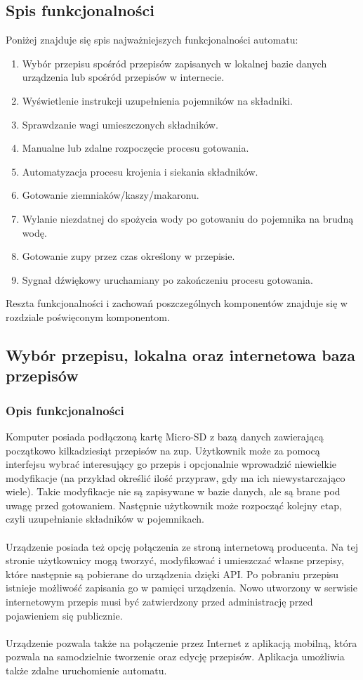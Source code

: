 \documentclass[12pt,a4paper,notitlepage]{article}
\begin{document}
\subsection{Spis funkcjonalności}
Poniżej znajduje się spis najważniejszych funkcjonalności automatu:
\begin{enumerate}
  \item Wybór przepisu spośród przepisów zapisanych w lokalnej bazie danych urządzenia lub spośród przepisów w internecie.
  \item Wyświetlenie instrukcji uzupełnienia pojemników na składniki.
  \item Sprawdzanie wagi umieszczonych składników.
  \item Manualne lub zdalne rozpoczęcie procesu gotowania.
  \item Automatyzacja procesu krojenia i siekania składników.
  \item Gotowanie ziemniaków/kaszy/makaronu.
  \item Wylanie niezdatnej do spożycia wody po gotowaniu do pojemnika na brudną wodę.
  \item Gotowanie zupy przez czas określony w przepisie.
  \item Sygnał dźwiękowy uruchamiany po zakończeniu procesu gotowania.
\end{enumerate}
Reszta funkcjonalności i zachowań poszczególnych komponentów znajduje się w rozdziale poświęconym komponentom.

\subsection{Wybór przepisu, lokalna oraz internetowa baza przepisów}
\subsubsection{Opis funkcjonalności}
Komputer posiada podłączoną kartę Micro-SD z bazą danych zawierającą początkowo kilkadziesiąt przepisów na zup. Użytkownik może za pomocą interfejsu wybrać interesujący go przepis i opcjonalnie wprowadzić niewielkie modyfikacje (na przykład określić ilość przypraw, gdy ma ich niewystarczająco wiele). Takie modyfikacje nie są zapisywane w bazie danych, ale są brane pod uwagę przed gotowaniem. Następnie użytkownik może rozpocząć kolejny etap, czyli uzupełnianie składników w pojemnikach.\\ \\
Urządzenie posiada też opcję połączenia ze stroną internetową producenta. Na tej stronie użytkownicy mogą tworzyć, modyfikować i umieszczać własne przepisy, które następnie są pobierane do urządzenia dzięki API. Po pobraniu przepisu istnieje możliwość zapisania go w pamięci urządzenia. Nowo utworzony w serwisie internetowym przepis musi być zatwierdzony przed administrację przed pojawieniem się publicznie.\\ \\
Urządzenie pozwala także na połączenie przez Internet z aplikacją mobilną, która pozwala na samodzielnie tworzenie oraz edycję przepisów. Aplikacja umożliwia także zdalne uruchomienie automatu.\\
\end{document}
